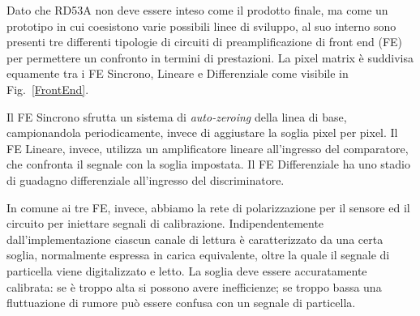 
Dato che RD53A non deve essere inteso come il prodotto finale, ma come un prototipo in cui coesistono varie possibili linee di sviluppo, al suo interno sono presenti tre differenti tipologie di circuiti di preamplificazione di front end (FE) per permettere un confronto in termini di prestazioni.
La pixel matrix \`e suddivisa equamente tra i FE Sincrono, Lineare e Differenziale come visibile in Fig.~\ref{FrontEnd}. 

Il FE Sincrono sfrutta un sistema di \textit{auto-zeroing} della linea di base, campionandola periodicamente, invece di aggiustare la soglia pixel per pixel. 
Il FE Lineare, invece, utilizza un amplificatore lineare all'ingresso del comparatore, che confronta il segnale con la soglia impostata. 
Il FE Differenziale ha uno stadio di guadagno differenziale all'ingresso del discriminatore. %

In comune ai tre FE, invece, abbiamo la rete di polarizzazione per il sensore ed il circuito per iniettare segnali di calibrazione. Indipendentemente dall'implementazione ciascun canale di lettura \`e caratterizzato da una certa soglia, normalmente espressa in carica equivalente, oltre la quale il segnale di particella viene digitalizzato e letto. La soglia deve essere accuratamente calibrata: se \`e troppo alta si possono avere inefficienze; se troppo bassa una fluttuazione di rumore pu\`o essere confusa con un segnale di particella.

